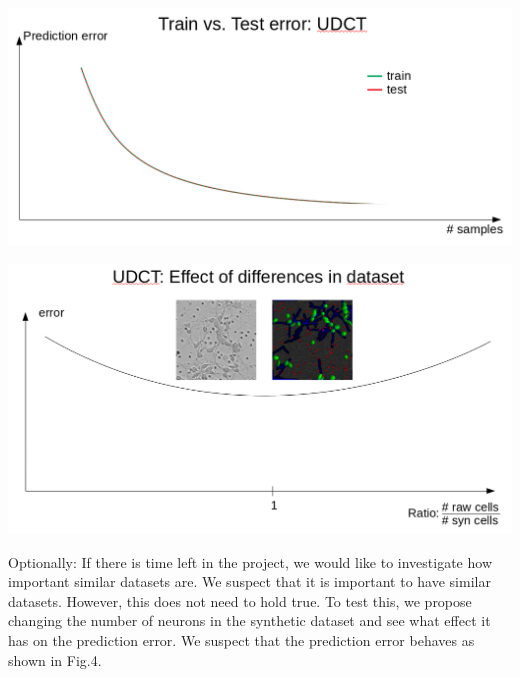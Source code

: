 \documentclass[10pt]{article}
\newenvironment{Figure}
		{\par\medskip\noindent\minipage{\linewidth}}
		{\endminipage\par\medskip}
\begin{document}
		\begin{multicols}{2}
		
			\begin{Figure}
				\centering
				\includegraphics[width=\textwidth]{Figures/train_vs_test_UDCT.png}
				\label{fig:countception}
			\end{Figure}
		
			\begin{Figure}
				\centering
				\includegraphics[width=\textwidth]{Figures/ratio.png}
				\label{fig:ratio}
			\end{Figure}
			
		\end{multicols}
		
		Optionally: If there is time left in the project, we would like to investigate how important similar datasets are. We suspect that it is important to have similar datasets. However, this does not need to hold true. To test this, we propose changing the number of neurons in the synthetic dataset and see what effect it has on the prediction error. We suspect that the prediction error behaves as shown in Fig.4.
			
\end{document}
